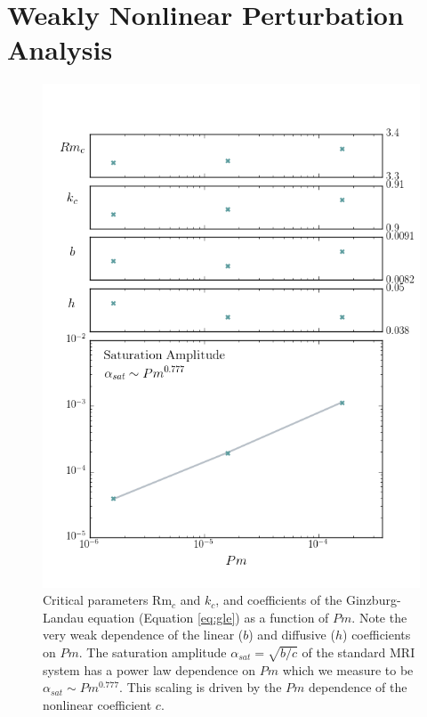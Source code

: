 \documentclass{emulateapj}
\newcommand\reym{\mathrm{Rm}}
\begin{document}
\section{Weakly Nonlinear Perturbation Analysis}\label{sec:wnl_analysis}

\begin{figure}
\centering
\includegraphics[width=\columnwidth]{../figures/widegap_coeffs_satampscaling.png}
\caption{Critical parameters $\reym_c$ and $k_c$, and coefficients of the Ginzburg-Landau equation (Equation \ref{eq:gle}) as a function of $Pm$. Note the very weak dependence of the linear ($b$) and diffusive ($h$) coefficients on $Pm$. The saturation amplitude $\alpha_{sat} = \sqrt{b/c}$ of the standard MRI system has a power law dependence on $Pm$ which we measure to be $\alpha_{sat} \sim Pm^{0.777}$. This scaling is driven by the $Pm$ dependence of the nonlinear coefficient $c$.}\label{fig:coefficients}
\end{figure}
\end{document}
